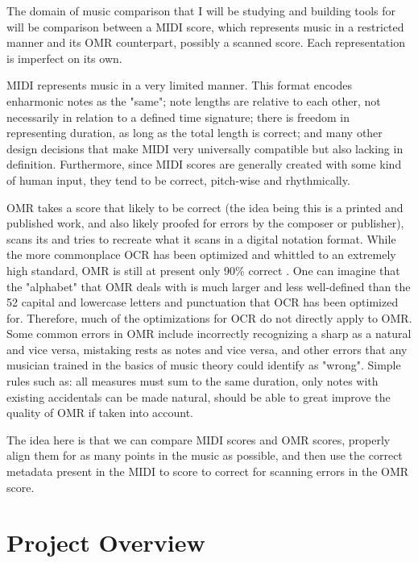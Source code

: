 The domain of music comparison that I will be studying and building tools for will be comparison between a MIDI score, which represents music in a restricted manner and its OMR counterpart, possibly a scanned score. Each representation is imperfect on its own.

MIDI represents music in a very limited manner. This format encodes enharmonic notes as the "same"; note lengths are relative to each other, not necessarily in relation to a defined time signature; there is freedom in representing duration, as long as the total length is correct; and many other design decisions that make MIDI very universally compatible but also lacking in definition. Furthermore, since MIDI scores are generally created with some kind of human input, they tend to be correct, pitch-wise and rhythmically. 
 
OMR takes a score that likely to be correct (the idea being this is a printed and published work, and also likely proofed for errors by the composer or publisher), scans its and tries to recreate what it scans in a digital notation format. While the more commonplace OCR has been optimized and whittled to an extremely high standard, OMR is still at present only 90\% correct \cite{omr}. One can imagine that the "alphabet" that OMR deals with is much larger and less well-defined than the 52 capital and lowercase letters and punctuation that OCR has been optimized for. Therefore, much of the optimizations for OCR do not directly apply to OMR. Some common errors in OMR include incorrectly recognizing a sharp as a natural and vice versa, mistaking rests as notes and vice versa, and other errors that any musician trained in the basics of music theory could identify as "wrong". Simple rules such as: all measures must sum to the same duration, only notes with existing accidentals can be made natural, should be able to great improve the quality of OMR if taken into account.

The idea here is that we can compare MIDI scores and OMR scores, properly align them for as many points in the music as possible, and then use the correct metadata present in the MIDI to score to correct for scanning errors in the OMR score. 


\section{Project Overview}

